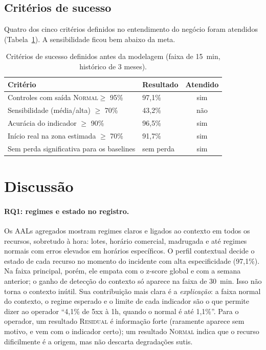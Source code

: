 \documentclass[sigconf,nonacm]{acmart}
\newcommand{\Normal}{\textsc{Normal}\xspace}
\newcommand{\Residual}{\textsc{Residual}\xspace}
\begin{document}
\subsection{Critérios de sucesso}
Quatro dos cinco critérios definidos no entendimento do negócio foram atendidos (Tabela~\ref{tab:criterios}). A sensibilidade ficou bem abaixo da meta.

\begin{table}[t]
  \caption{Critérios de sucesso definidos antes da modelagem (faixa de 15~min, histórico de 3 meses).}
  \label{tab:criterios}
  \small
  \begin{tabular}{p{}p{}c}
    \toprule
    Critério & Resultado & Atendido \\
    \midrule
    Controles com saída \Normal $\geq$ 95\% & 97,1\% & sim \\
    Sensibilidade (média/alta) $\geq$ 70\% & 43,2\% & não \\
    Acurácia do indicador $\geq$ 90\% & 96,5\% & sim \\
    Início real na zona estimada $\geq$ 70\% & 91,7\% & sim \\
    Sem perda significativa para os baselines & sem perda & sim \\
    \bottomrule
  \end{tabular}
\end{table}

\section{Discussão}\label{sec:discussao}

\paragraph{RQ1: regimes e estado no registro.} Os AALs agregados mostram regimes claros e ligados ao contexto em todos os recursos, sobretudo à hora: lotes, horário comercial, madrugada e até regimes normais com erros elevados em horários específicos. O perfil contextual decide o estado de cada recurso no momento do incidente com alta especificidade (97,1\%). Na faixa principal, porém, ele empata com o z-score global e com a semana anterior; o ganho de detecção do contexto só aparece na faixa de 30~min. Isso não torna o contexto inútil. Sua contribuição mais clara é a \emph{explicação}: a faixa normal do contexto, o regime esperado e o limite de cada indicador são o que permite dizer ao operador ``4,1\% de 5xx à 1h, quando o normal é até 1,1\%''. Para o operador, um resultado \Residual é informação forte (raramente aparece sem motivo, e vem com o indicador certo); um resultado \Normal indica que o recurso dificilmente é a origem, mas não descarta degradações sutis.
\end{document}
